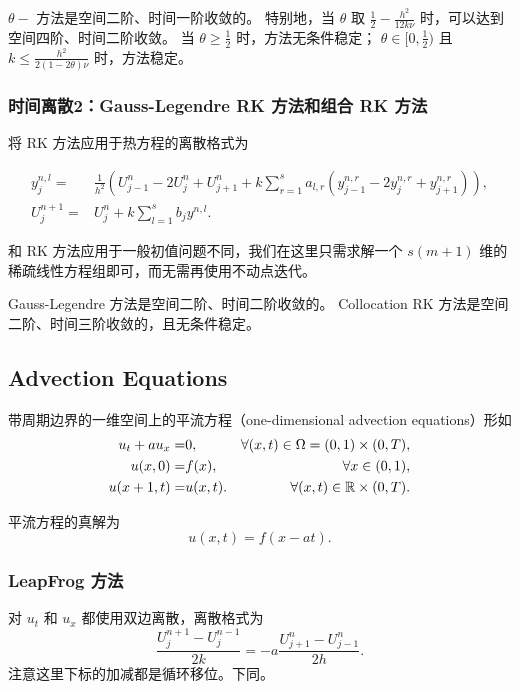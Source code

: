 \documentclass[lang=cn,a4paper,newtx,bibend=bibtex]{elegantpaper}
\begin{document}
$\theta-$ 方法是空间二阶、时间一阶收敛的。
特别地，当 $\theta$ 取 $\frac 12-\frac {h^2}{12k\nu}$ 时，可以达到空间四阶、时间二阶收敛。
当 $\theta\geq \frac 12$ 时，方法无条件稳定；
$\theta\in [0,\frac 12)$ 且 $k\leq \frac{h^2}{2(1-2\theta)\nu}$ 时，方法稳定。

\subsubsection{时间离散2：Gauss-Legendre RK 方法和组合 RK 方法}

将 RK 方法应用于热方程的离散格式为

\begin{eqnarray}
    y_j^{n,l} = & \frac 1{h^2}(U_{j-1}^n - 2U_j^n + U_{j+1}^n + k\sum_{r=1}^sa_{l,r}(y_{j-1}^{n,r} - 2y_j^{n,r} + y_{j+1}^{n,r})), \\
    U_j^{n+1} = & U_j^n + k\sum_{l=1}^s b_jy^{n,l}.
\end{eqnarray}

和 RK 方法应用于一般初值问题不同，我们在这里只需求解一个 $s(m+1)$ 维的稀疏线性方程组即可，而无需再使用不动点迭代。

Gauss-Legendre 方法是空间二阶、时间二阶收敛的。
Collocation RK 方法是空间二阶、时间三阶收敛的，且无条件稳定。

\subsection{Advection Equations}

带周期边界的一维空间上的平流方程（one-dimensional advection equations）形如
\begin{eqnarray}
    u_t + au_x = & 0, & \forall (x,t)\in \Omega = (0,1)\times (0,T), \\
    u(x,0) = & f(x), & \forall x\in (0,1), \\
    u(x+1, t) = & u(x, t). & \forall (x,t)\in \mathbb{R}\times (0,T). \\
\end{eqnarray}

平流方程的真解为
\begin{equation}
    u(x,t) = f(x-at).
\end{equation}

\subsubsection{LeapFrog 方法}

对 $u_t$ 和 $u_x$ 都使用双边离散，离散格式为
\begin{equation}
    \frac{U_j^{n+1} - U_j^{n-1}}{2k} = -a\frac{U_{j+1}^n - U_{j-1}^n}{2h}.
\end{equation}
注意这里下标的加减都是循环移位。下同。
\end{document}
